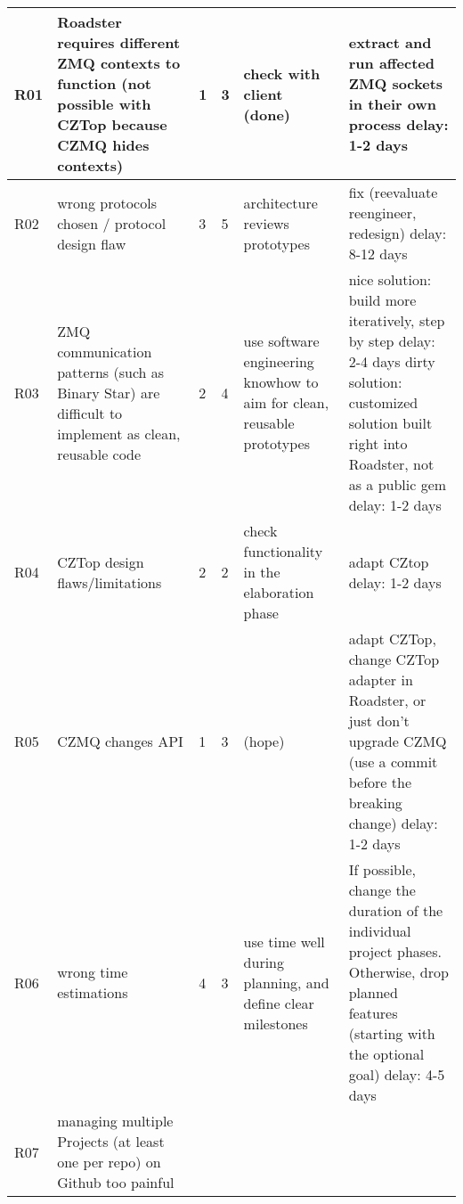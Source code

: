 \begin{center}
\begin{longtable}{|p{6mm}|p{30mm}|p{6mm}|p{8mm}|p{30mm}|p{64mm}|}
    \hline
    \endlastfoot
    R01
		& Roadster requires different ZMQ contexts to function (not possible with CZTop because CZMQ hides contexts)
		& \cellcolor{yellow!50}1
		& \cellcolor{yellow!50}3
		& check with client	(done)
		& extract and run affected ZMQ \newline sockets in their own process \newline delay: 1-2 days \\ \hline
	R02 
		& wrong protocols chosen / protocol design flaw
		& \cellcolor{red!50}3
		& \cellcolor{red!50}5
		& architecture \newline reviews prototypes
		& fix (reevaluate reengineer, redesign) \newline delay: 8-12 days	\\ \hline
	R03 
		& ZMQ communication patterns (such as Binary Star) are difficult to implement as clean, reusable code
		& \cellcolor{yellow!50}2 
		& \cellcolor{yellow!50}4 
		& use software engineering knowhow to aim for clean, reusable prototypes
		& nice solution: \newline build more iteratively, step by step \newline delay: 2-4 days \newline \newline dirty solution: 
		\newline customized solution built right into Roadster, not as a public gem \newline delay: 1-2 days \\ \hline
	R04	
		& CZTop design flaws/limitations
		& \cellcolor{yellow!50}2
		& \cellcolor{yellow!50}2
		& check functionality in the elaboration phase
		& adapt CZtop \newline delay: 1-2 days \\ \hline		
	R05 
		& CZMQ changes API
		& \cellcolor{yellow!50}1
		& \cellcolor{yellow!50}3
		& (hope)
		& adapt CZTop, change CZTop adapter in Roadster, or just don't upgrade CZMQ (use a commit before the breaking change) \newline delay: 1-2 days \\ \hline
	R06 
		& wrong time estimations
		& \cellcolor{orange!50}4
		& \cellcolor{orange!50}3
		& use time well during planning, and define clear milestones
		& If possible, change the duration of the individual project phases. Otherwise, drop planned features
		(starting with the optional goal) \newline delay: 4-5 days \\ \hline		
	R07 
		& managing multiple Projects (at least one per repo) on Github too painful

\end{longtable}
\end{center}
